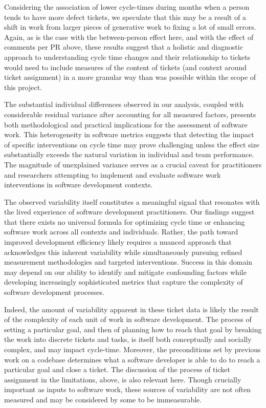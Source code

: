 \documentclass[
]{article}
\begin{document}
Considering the association of lower cycle-times during months when a
person tends to have more defect tickets, we speculate that this may be
a result of a shift in work from larger pieces of generative work to
fixing a lot of small errors. Again, as is the case with the
between-person effect here, and with the effect of comments per PR
above, these results suggest that a holistic and diagnostic approach to
understanding cycle time changes and their relationship to tickets would
need to include measures of the content of tickets (and context around
ticket assignment) in a more granular way than was possible within the
scope of this project.

The substantial individual differences observed in our analysis, coupled
with considerable residual variance after accounting for all measured
factors, presents both methodological and practical implications for the
assessment of software work. This heterogeneity in software metrics
suggests that detecting the impact of specific interventions on cycle
time may prove challenging unless the effect size substantially exceeds
the natural variation in individual and team performance. The magnitude
of unexplained variance serves as a crucial caveat for practitioners and
researchers attempting to implement and evaluate software work
interventions in software development contexts.

The observed variability itself constitutes a meaningful signal that
resonates with the lived experience of software development
practitioners. Our findings suggest that there exists no universal
formula for optimizing cycle time or enhancing software work across all
contexts and individuals. Rather, the path toward improved development
efficiency likely requires a nuanced approach that acknowledges this
inherent variability while simultaneously pursuing refined measurement
methodologies and targeted interventions. Success in this domain may
depend on our ability to identify and mitigate confounding factors while
developing increasingly sophisticated metrics that capture the
complexity of software development processes.

Indeed, the amount of variability apparent in these ticket data is
likely the result of the complexity of each unit of work in software
development. The process of setting a particular goal, and then of
planning how to reach that goal by breaking the work into discrete
tickets and tasks, is itself both conceptually and socially complex, and
may impact cycle-time. Moreover, the preconditions set by previous work
on a codebase determines what a software developer is able to do to
reach a particular goal and close a ticket. The discussion of the
process of ticket assignment in the limitations, above, is also relevant
here. Though crucially important as inputs to software work, these
sources of variability are not often measured and may be considered by
some to be immeasurable.
\end{document}
